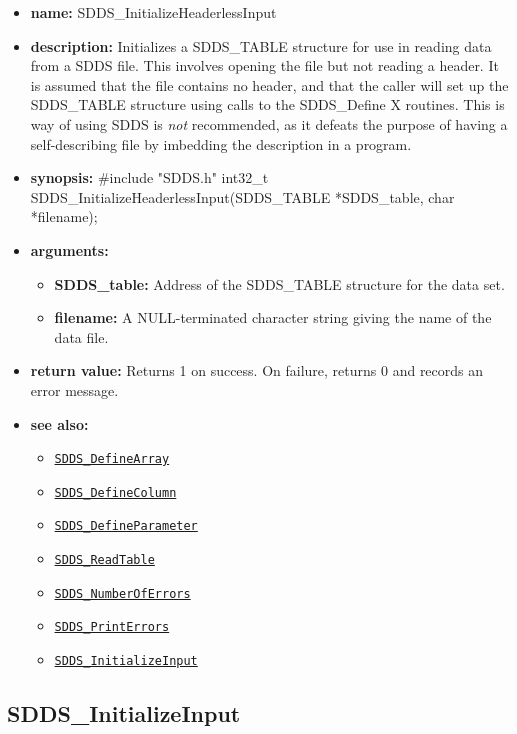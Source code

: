 \documentclass[11pt]{article}
\newcommand{\progref}[1]{\hyperref[SDDS_#1]{\tt SDDS\_#1}}
\begin{document}
\begin{itemize}
\item {\bf name:}\newline
SDDS\_InitializeHeaderlessInput
\item {\bf description:}\newline
Initializes a SDDS\_TABLE structure for use in reading data from a SDDS file. This involves opening the file but not reading a header. It is assumed that the file contains no header, and that the caller will set up the SDDS\_TABLE structure using calls to the SDDS\_Define X routines. This is way of using SDDS is {\em not} recommended, as it defeats the purpose of having a self-describing file by imbedding the description in a program.
\item {\bf synopsis:} \#include "SDDS.h"\newline
int32\_t SDDS\_InitializeHeaderlessInput(SDDS\_TABLE *SDDS\_table, char *filename);
\item {\bf arguments:}
\begin{itemize}
\item {\bf SDDS\_table:} Address of the SDDS\_TABLE structure for the data set.
\item {\bf filename:} A NULL-terminated character string giving the name of the data file.
\end{itemize}
\item {\bf return value:}\newline
Returns 1 on success. On failure, returns 0 and records an error message.
\item {\bf see also:}
\begin{itemize}
\item \progref{DefineArray}
\item \progref{DefineColumn}
\item \progref{DefineParameter}
\item \progref{ReadTable}
\item \progref{NumberOfErrors}
\item \progref{PrintErrors}
\item \progref{InitializeInput}
\end{itemize}
\end{itemize}

\subsection{SDDS\_InitializeInput}
\label{SDDS_InitializeInput}
\end{document}
